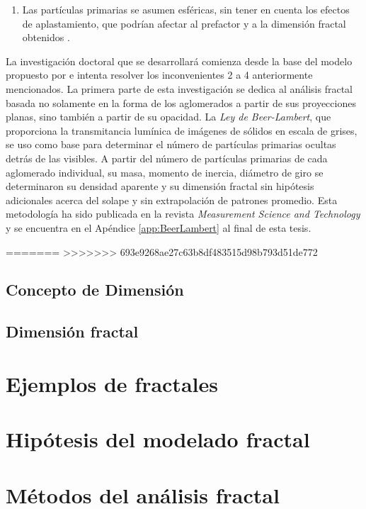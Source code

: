 \begin{enumerate}
	\item Las partículas primarias se asumen esféricas, sin tener en cuenta los efectos de aplastamiento, que podrían afectar al prefactor y a la dimensión fractal obtenidos \cite{ohetal:1997,brasiletal:1999,alzaitoneetal:2009}.
\end{enumerate}

\par La investigación doctoral que se desarrollará comienza desde la base del modelo propuesto por \cite{lapuertaetal:2006} e intenta resolver los inconvenientes 2 a 4 anteriormente mencionados. La primera parte de esta investigación se dedica al análisis fractal  basada no solamente en la forma de los aglomerados a partir de sus proyecciones planas, sino también a partir de su opacidad. La \emph{Ley de Beer-Lambert}, que proporciona la transmitancia lumínica de imágenes de sólidos en escala de grises, se uso como base para determinar el número de partículas primarias ocultas detrás de las visibles. A partir del número de partículas primarias de cada aglomerado individual, su masa, momento de inercia, diámetro de giro se determinaron su densidad aparente y su dimensión fractal sin hipótesis adicionales acerca del solape y sin extrapolación de patrones promedio. Esta metodología ha sido publicada en la revista \textit{Measurement Science and Technology} y se encuentra en el Apéndice \ref{app:BeerLambert} al final de esta tesis.

=======
>>>>>>> 693e9268ae27c63b8df483515d98b793d51de772
\subsection{Concepto de Dimensión}
\subsection{Dimensión fractal}
\section{Ejemplos de fractales}\label{sec:EjemplosFractales}
\section{Hipótesis del modelado fractal}\label{sec:HipotesisModeladoFractal}
\section{Métodos del análisis fractal}\label{sec:MetodosAnalisisFractal}
